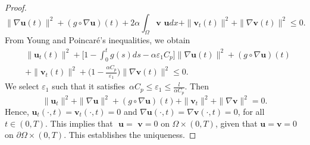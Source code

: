 \begin{proof}
\[ \| \nabla \mathbf{u}(t) \|^2 +(g\circ \nabla \mathbf{u})(t)
 +2 \alpha \int_\Omega \mathbf{v}\textbf{ u}dx
 +\| \mathbf{v}_{t} (t)\|^2 + \| \nabla \mathbf{v}(t) \|^2 \leq 0.
\]
 From Young and Poincar\'e's inequalities, we obtain
\begin{align*}
&\| \mathbf{u}_{t}(t) \| ^2+ \Big[ 1-\int_0^t g(s) ds
 -\alpha \varepsilon_{1} C_p \Big] \| \nabla \mathbf{u}(t) \|^2
 +(g\circ \nabla \mathbf{u})(t)\\
&+\| \mathbf{v}_{t}(t) \|^2 + \Big( 1-\frac{\alpha C_{p}}{\varepsilon_{1} }\Big)
\| \nabla \mathbf{v}(t) \|^2 \leq 0.
\end{align*}
We select $\varepsilon_{1}$ such that it satisfies\,
$\alpha C_p \leq \varepsilon_{1}\leq \frac{l}{\alpha C_p}$. Then
\[
 \| \mathbf{u}_{t} \|^2 + \| \nabla \mathbf{u} \|^2
 +(g\circ\nabla \mathbf{u})(t)+\| \mathbf{v}_{t} \|^2 + \| \nabla \mathbf{v} \|^2=0.
\]
Hence, \( \mathbf{u}_t(\cdot, t) = \mathbf{v}_t(\cdot, t) = 0 \) and
\( \nabla \mathbf{u}(\cdot, t) = \nabla\mathbf{v}(\cdot, t) = 0 \), for all
\( t \in (0, T) \). This implies that \( \textbf{ u} = \textbf{ v} = 0 \) on
\( \Omega \times (0, T) \), given that \( \mathbf{u} = \mathbf{v} = 0 \) on
\( \partial\Omega \times (0, T) \). This establishes the uniqueness.
\end{proof}

